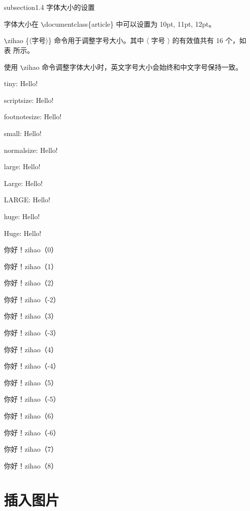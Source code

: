 \documentclass[fontset=windows]{article}
\begin{document}
   
   {\songti 
   
    subsection{1.4 字体大小的设置}
	
	字体大小在 \verb|\|documentclass\{article\} 中可以设置为 10pt, 11pt, 12pt。
	
	\verb|\|zihao \{〈字号〉\} 命令用于调整字号大小。其中 〈 字号 〉 的有效值共有 16 个，如表 所示。
	
	使用 \verb|\|zihao 命令调整字体大小时，英文字号大小会始终和中文字号保持一致。
 
{\tiny tiny: Hello!}\par
{\scriptsize scriptsize: Hello!}\par
{\footnotesize footnotesize: Hello!}\par
{\small small: Hello!}\par
{\normalsize normalsize: Hello!}\par
{\large large: Hello!}\par
{\Large Large: Hello!}\par
{\LARGE LARGE: Hello!}\par
{\huge huge: Hello!}\par
{\Huge Huge: Hello!}\par

 你好！zihao（0）\par
{} 你好！zihao（1）\par
{} 你好！zihao（2）\par
{} 你好！zihao（-2）\par
{} 你好！zihao（3）\par
{} 你好！zihao（-3）\par
{} 你好！zihao（4）\par
{} 你好！zihao（-4）\par
{} 你好！zihao（5）\par
{} 你好！zihao（-5）\par
{} 你好！zihao（6）\par
{} 你好！zihao（-6）\par
{} 你好！zihao（7）\par
{} 你好！zihao（8）\par 

	} \par
\section{插入图片}
\end{document}
